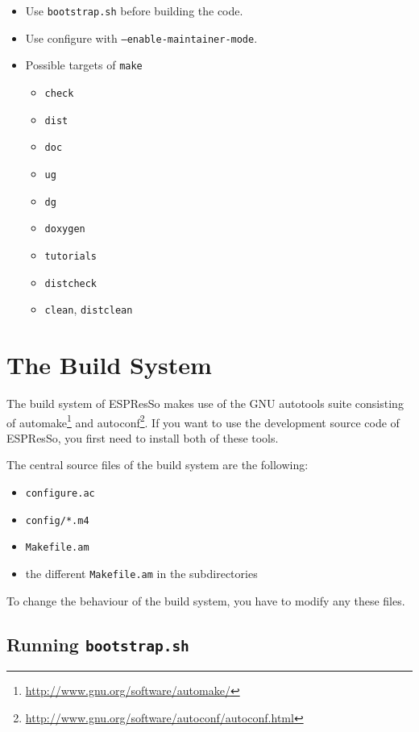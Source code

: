 \documentclass[
a4paper,                        %
11pt,                           %
twoside,                        %
footsepline,                    %
headsepline,                    %
headexclude,                    %
footexclude,                    %
pagesize,                       %
bibtotocnumbered,               %
idxtotoc                        %
]{scrartcl}
\begin{document}
\begin{itemize}
\item Use \texttt{bootstrap.sh} before building the code.
\item Use configure with \texttt{--enable-maintainer-mode}.
\item Possible targets of \texttt{make}
  \begin{itemize}
  \item \texttt{check}
  \item \texttt{dist}
  \item \texttt{doc}
  \item \texttt{ug}
  \item \texttt{dg}
  \item \texttt{doxygen}
  \item \texttt{tutorials}
  \item \texttt{distcheck}
  \item \texttt{clean}, \texttt{distclean}
  \end{itemize}
\end{itemize}

\section{The Build System}
\label{sec:build_system}

The build system of ESPResSo makes use of the GNU autotools suite
consisting of
automake\footnote{\url{http://www.gnu.org/software/automake/}} and
autoconf\footnote{\url{http://www.gnu.org/software/autoconf/autoconf.html}}.
If you want to use the development source code of ESPResSo, you first
need to install both of these tools.

The central source files of the build system are the following:
\begin{itemize}
\item \texttt{configure.ac}
\item \texttt{config/*.m4}
\item \texttt{Makefile.am}
\item the different \texttt{Makefile.am} in the subdirectories
\end{itemize}

To change the behaviour of the build system, you have to modify any
these files.

\subsection{Running \texttt{bootstrap.sh}}
\end{document}
